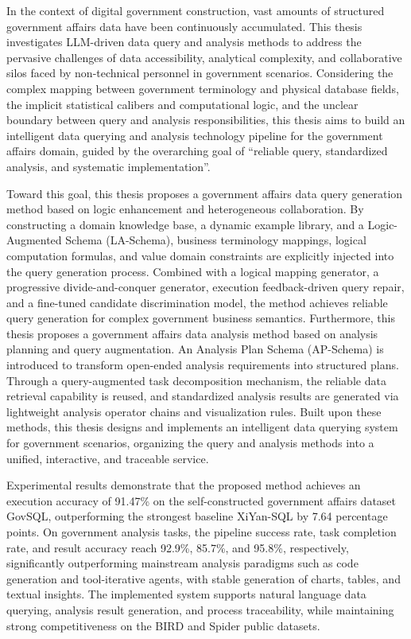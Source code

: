 
\eabstract
{
In the context of digital government construction, vast amounts of structured government affairs data have been continuously accumulated. 
This thesis investigates LLM-driven data query and analysis methods to address the pervasive challenges of data accessibility, analytical complexity, and collaborative silos faced by non-technical personnel in government scenarios.
Considering the complex mapping between government terminology and physical database fields, the implicit statistical calibers and computational logic, and the unclear boundary between query and analysis responsibilities, this thesis aims to build an intelligent data querying and analysis technology pipeline for the government affairs domain, guided by the overarching goal of ``reliable query, standardized analysis, and systematic implementation''.

Toward this goal, this thesis proposes a government affairs data query generation method based on logic enhancement and heterogeneous collaboration. By constructing a domain knowledge base, a dynamic example library, and a Logic-Augmented Schema (LA-Schema), business terminology mappings, logical computation formulas, and value domain constraints are explicitly injected into the query generation process. Combined with a logical mapping generator, a progressive divide-and-conquer generator, execution feedback-driven query repair, and a fine-tuned candidate discrimination model, the method achieves reliable query generation for complex government business semantics. Furthermore, this thesis proposes a government affairs data analysis method based on analysis planning and query augmentation. An Analysis Plan Schema (AP-Schema) is introduced to transform open-ended analysis requirements into structured plans. Through a query-augmented task decomposition mechanism, the reliable data retrieval capability is reused, and standardized analysis results are generated via lightweight analysis operator chains and visualization rules. Built upon these methods, this thesis designs and implements an intelligent data querying system for government scenarios, organizing the query and analysis methods into a unified, interactive, and traceable service.

Experimental results demonstrate that the proposed method achieves an execution accuracy of 91.47\% on the self-constructed government affairs dataset GovSQL, outperforming the strongest baseline XiYan-SQL by 7.64 percentage points. On government analysis tasks, the pipeline success rate, task completion rate, and result accuracy reach 92.9\%, 85.7\%, and 95.8\%, respectively, significantly outperforming mainstream analysis paradigms such as code generation and tool-iterative agents, with stable generation of charts, tables, and textual insights. The implemented system supports natural language data querying, analysis result generation, and process traceability, while maintaining strong competitiveness on the BIRD and Spider public datasets.

}
